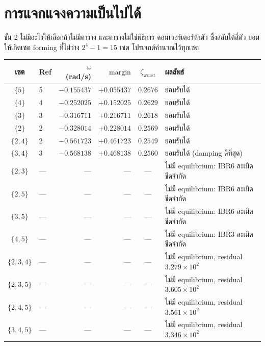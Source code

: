\documentclass[12pt,a4paper]{article}
\theoremstyle{remark}
\newcommand{\zworst}{\zeta_{\mathrm{worst}}}
\begin{document}
\section{การแจกแจงความเป็นไปได้}\label{sec:admissibility}

ขั้น 2 ไม่มีอะไรให้เลือกถ้าไม่มีตาราง และตารางไม่ใช่พิธีการ คอนเวอร์เตอร์ห้าตัว
ซึ่งสลับได้สี่ตัว ยอมให้เกิดเซต forming ที่ไม่ว่าง $2^4 - 1 = 15$ เซต
โปรเจกต์คำนวณไว้ทุกเซต

\begin{table}[H]
\centering
\small
\begin{tabular}{@{}clrrcl@{}}
\toprule
\textbf{เซต} & \textbf{Ref} & $\omega$ (rad/s) & $\mathrm{margin}$ & $\zworst$ & \textbf{ผลลัพธ์}\\
\midrule
$\{5\}$        & 5 & $-0.155437$ & $+0.055437$ & $0.2676$ & ยอมรับได้\\
$\{4\}$        & 4 & $-0.252025$ & $+0.152025$ & $0.2629$ & ยอมรับได้\\
$\{3\}$        & 3 & $-0.316711$ & $+0.216711$ & $0.2618$ & ยอมรับได้\\
$\{2\}$        & 2 & $-0.328014$ & $+0.228014$ & $0.2569$ & ยอมรับได้\\
$\{2,4\}$      & 2 & $-0.561723$ & $+0.461723$ & $0.2549$ & ยอมรับได้\\
$\{3,4\}$      & 3 & $\mathbf{-0.568138}$ & $\mathbf{+0.468138}$ & $0.2560$ & ยอมรับได้ (damping ดีที่สุด)\\
\midrule
$\{2,3\}$      & --- & --- & --- & --- & ไม่มี equilibrium: IBR6 ละเมิดขีดจำกัด\\
$\{2,5\}$      & --- & --- & --- & --- & ไม่มี equilibrium: IBR6 ละเมิดขีดจำกัด\\
$\{3,5\}$      & --- & --- & --- & --- & ไม่มี equilibrium: IBR6 ละเมิดขีดจำกัด\\
$\{4,5\}$      & --- & --- & --- & --- & ไม่มี equilibrium: IBR3 ละเมิดขีดจำกัด\\
\midrule
$\{2,3,4\}$    & --- & --- & --- & --- & ไม่มี equilibrium, residual $3.279\times10^{2}$\\
$\{2,3,5\}$    & --- & --- & --- & --- & ไม่มี equilibrium, residual $3.605\times10^{2}$\\
$\{2,4,5\}$    & --- & --- & --- & --- & ไม่มี equilibrium, residual $3.561\times10^{2}$\\
$\{3,4,5\}$    & --- & --- & --- & --- & ไม่มี equilibrium, residual $3.346\times10^{2}$\\

\end{tabular}
\end{table}
\end{document}
